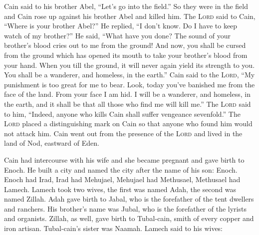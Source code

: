 \begin{inparaenum}
   Cain said to his brother Abel, ``Let's go into the field.'' So they were in the field and Cain rose up against his brother Abel and killed him.%
   The \textsc{Lord} said to Cain, ``Where is your brother Abel?'' He replied, ``I don't know. Do I have to keep watch of my brother?''%
   He said, ``What have you done? The sound of your brother's blood cries out to me from the ground!%
   And now, you shall be cursed from the ground which has opened its mouth to take your brother's blood from your hand.%
   When you till the ground, it will never again yield its strength to you. You shall be a wanderer, and homeless, in the earth.''%
   Cain said to the \textsc{Lord}, ``My punishment is too great for me to bear.%
   Look, today you've banished me from the face of the land. From your face I am hid. I will be a wanderer, and homeless, in the earth, and it shall be that all those who find me will kill me.''%
   The \textsc{Lord} said to him, ``Indeed, anyone who kills Cain shall suffer vengeance sevenfold.'' The \textsc{Lord} placed a distinguishing mark on Cain so that anyone who found him would not attack him.%
   Cain went out from the presence of the \textsc{Lord} and lived in the land of Nod, eastward of Eden.%
  
   Cain had intercourse with his wife and she became pregnant and gave birth to Enoch. He built a city and named the city after the name of his son: Enoch.%
   Enoch had Irad, Irad had Mehujael, Mehujael had Methusael, Methusael had Lamech.%
   Lamech took two wives, the first was named Adah, the second was named Zillah.%
   Adah gave birth to Jabal, who is the forefather of the tent dwellers and ranchers.%
   His brother's name was Jubal, who is the forefather of the lyrists and organists.%
   Zillah, as well, gave birth to Tubal-cain, smith of every copper and iron artisan. Tubal-cain's sister was Naamah.%
   Lamech said to his wives:\smallskip%
  

\end{inparaenum}
